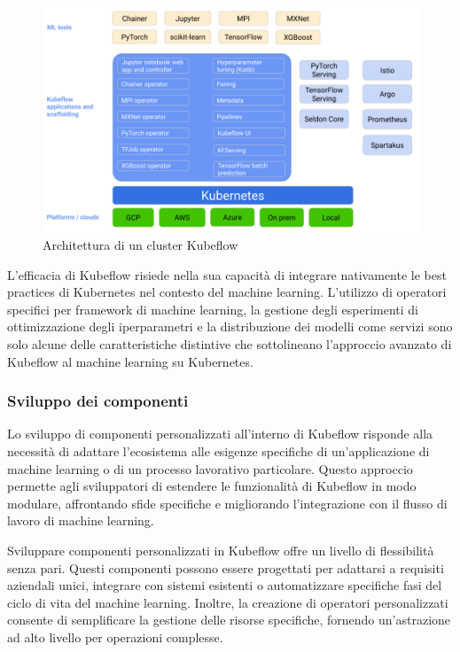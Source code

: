 \begin{figure}[h]
    \centering
    \includegraphics[width=\linewidth]{figures/ch3/kubeflow-arch.png}
    \caption[Architettura di un cluster Kubeflow]{Architettura di un cluster Kubeflow}
    \label{fig:cha3:kf-arch}
\end{figure}

L'efficacia di Kubeflow risiede nella sua capacità di integrare nativamente le best practices di Kubernetes nel contesto del machine learning. L'utilizzo di operatori specifici per framework di machine learning, la gestione degli esperimenti di ottimizzazione degli iperparametri e la distribuzione dei modelli come servizi sono solo alcune delle caratteristiche distintive che sottolineano l'approccio avanzato di Kubeflow al machine learning su Kubernetes.

\subsubsection{Sviluppo dei componenti}

Lo sviluppo di componenti personalizzati all'interno di Kubeflow risponde alla necessità di adattare l'ecosistema alle esigenze specifiche di un'applicazione di machine learning o di un processo lavorativo particolare. Questo approccio permette agli sviluppatori di estendere le funzionalità di Kubeflow in modo modulare, affrontando sfide specifiche e migliorando l'integrazione con il flusso di lavoro di machine learning.

Sviluppare componenti personalizzati in Kubeflow offre un livello di flessibilità senza pari. Questi componenti possono essere progettati per adattarsi a requisiti aziendali unici, integrare con sistemi esistenti o automatizzare specifiche fasi del ciclo di vita del machine learning. Inoltre, la creazione di operatori personalizzati consente di semplificare la gestione delle risorse specifiche, fornendo un'astrazione ad alto livello per operazioni complesse.

